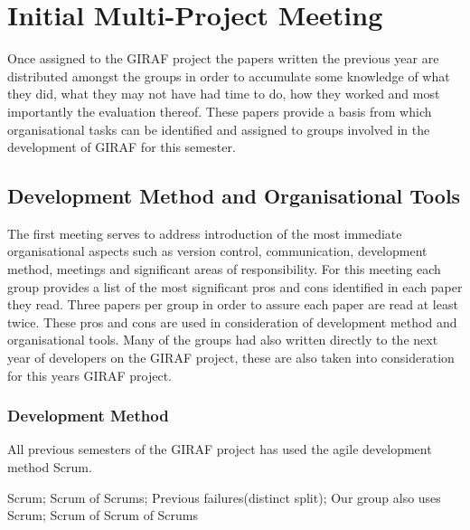 \section{Initial Multi-Project Meeting}
Once assigned to the GIRAF project the papers written the previous year are distributed amongst the groups in order to accumulate some knowledge of what they did, what they may not have had time to do, how they worked and most importantly the evaluation thereof.
These papers provide a basis from which organisational tasks can be identified and assigned to groups involved in the development of GIRAF for this semester.

\subsection{Development Method and Organisational Tools}
The first meeting serves to address introduction of the most immediate organisational aspects such as version control, communication, development method, meetings and significant areas of responsibility.
For this meeting each group provides a list of the most significant pros and cons identified in each paper they read.
Three papers per group in order to assure each paper are read at least twice.
These pros and cons are used in consideration of development method and organisational tools.
Many of the groups had also written directly to the next year of developers on the GIRAF project, these are also taken into consideration for this years GIRAF project. 

\subsubsection*{Development Method}
All previous semesters of the GIRAF project has used the agile development method Scrum.

Scrum; Scrum of Scrums; Previous failures(distinct split); Our group also uses Scrum; Scrum of Scrum of Scrums

